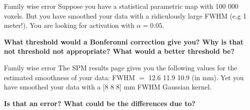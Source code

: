 \documentclass{beamer}
\begin{document}
\begin{frame}{Family wise error}
  Suppose you have a statistical parametric map with 100 000 voxels. \linebreak
  But you have smoothed your data with a ridiculously large FWHM (e.g 1 meter!). You are looking for activation with $\alpha = 0.05$. \linebreak

  \textbf{What threshold would a Bonferonni correction give you? Why is that not threshold not appropriate? What would a better threshold be?}

% 
\end{frame}


\begin{frame}{Family wise error}
  The SPM results page gives you the following values for the estimated smoothness of your data: FWHM $=$ 12.6 11.9 10.9 (in mm). Yet you have smoothed your data with a [8 8 8] mm FWHM Gaussian kernel. \linebreak

  \textbf{Is that an error? What could be the differences due to?}

% 
\end{frame}
\end{document}
